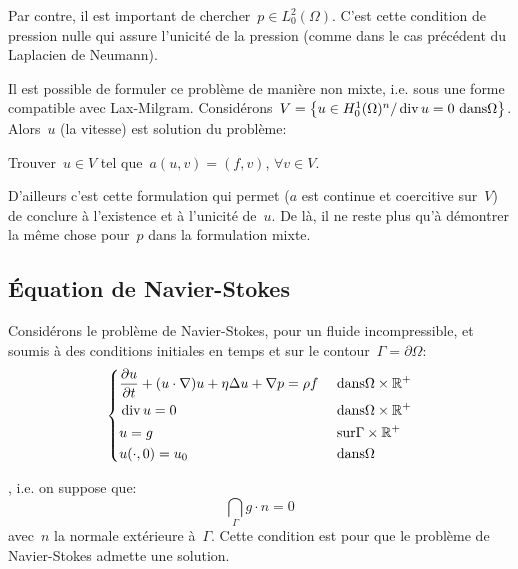 Par contre, il est important de chercher~$p \in L^2_0(\Omega)$. C'est cette condition
de pression nulle qui assure l'unicité de la pression (comme dans le cas précédent du
Laplacien de Neumann).

\medskip
Il est possible de formuler ce problème de manière non mixte, i.e. sous une forme
compatible avec Lax-Milgram.
Considérons~$V=\left\{ u\in H^1_0(\Omega)^n / \operatorname{div} u=0 \text{ dans} \Omega\right\}$.
Alors~$u$ (la vitesse) est solution du problème:
\begin{center}
Trouver~$u\in V$ tel que~$a(u,v)=(f,v)$, $\forall v\in V$.
\end{center}
D'ailleurs c'est cette formulation qui permet ($a$ est continue et coercitive sur~$V$) de
conclure à l'existence et à l'unicité de~$u$.
De là, il ne reste plus qu'à démontrer la même chose pour~$p$ dans la formulation mixte.

\medskip
\subsection{Équation de Navier-Stokes}

Considérons le problème de Navier-Stokes, pour un fluide incompressible, et soumis
à des conditions initiales en temps et sur le contour~$\Gamma=\partial\Omega$:
\begin{equation}\left\{
\begin{aligned}
&\dfrac{\partial u}{\partial t} + (u\cdot\nabla) u + \eta\Delta u + \nabla p = \rho f && \text{ dans} \Omega\times\mathbb R^+\\
&\operatorname{div} u = 0&& \text{ dans} \Omega\times\mathbb R^+\\
&u=g &&\text{ sur} \Gamma\times\mathbb R^+\\
&u(\cdot,0) =u_0 &&\text{ dans}\Omega
\end{aligned}\right.
\end{equation}

, i.e. on suppose que:
\begin{equation}
\dint_\Gamma g\cdot n %
= 0
\end{equation}
avec~$n$ la normale extérieure à~$\Gamma$.
Cette condition est  pour que le problème de Navier-Stokes admette une
solution.

